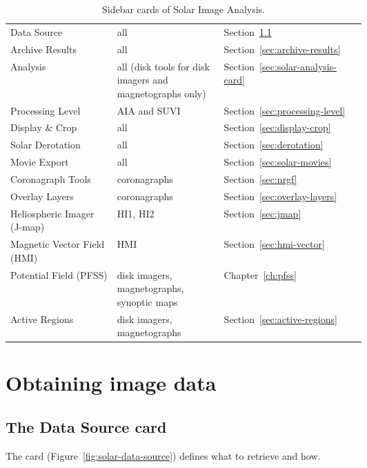 \begin{table}[!htbp]
  \centering
  \caption{Sidebar cards of Solar Image Analysis.}
  \label{tab:solar-cards}
  \small
  \begin{tabularx}{\linewidth}{@{}P{0.3\linewidth}P{0.3\linewidth}L@{}}
    \toprule
     &  &  \\
    \midrule
    Data Source & all & Section~\ref{sec:data-source} \\
    Archive Results & all & Section~\ref{sec:archive-results} \\
    Analysis & all (disk tools for disk imagers and magnetographs only) & Section~\ref{sec:solar-analysis-card} \\
    Processing Level & AIA and SUVI & Section~\ref{sec:processing-level} \\
    Display \& Crop & all & Section~\ref{sec:display-crop} \\
    Solar Derotation & all & Section~\ref{sec:derotation} \\
    Movie Export & all & Section~\ref{sec:solar-movies} \\
    Coronagraph Tools & coronagraphs & Section~\ref{sec:nrgf} \\
    Overlay Layers & coronagraphs & Section~\ref{sec:overlay-layers} \\
    Heliospheric Imager (J-map) & HI1, HI2 & Section~\ref{sec:jmap} \\
    Magnetic Vector Field (HMI) & HMI & Section~\ref{sec:hmi-vector} \\
    Potential Field (PFSS) & disk imagers, magnetographs, synoptic maps & Chapter~\ref{ch:pfss} \\
    Active Regions & disk imagers, magnetographs & Section~\ref{sec:active-regions} \\
    \bottomrule
  \end{tabularx}
\end{table}

\section{Obtaining image data}

\subsection{The Data Source card}
\label{sec:data-source}

The  card (Figure~\ref{fig:solar-data-source}) defines what to retrieve and
how.

